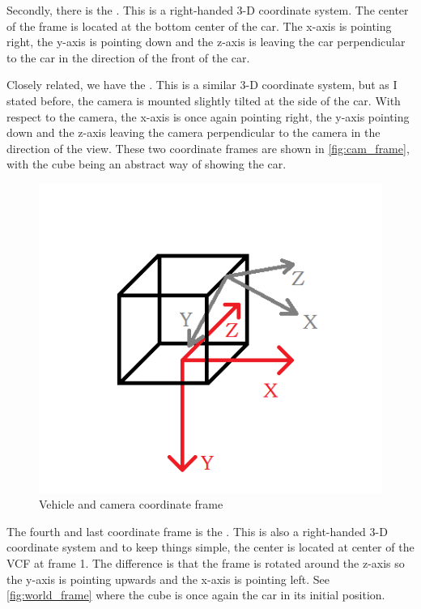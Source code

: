 Secondly, there is the . This is a right-handed 3-D coordinate system. The center of the frame is located at the bottom center of the car. The x-axis is pointing right, the y-axis is pointing down and the z-axis is leaving the car perpendicular to the car in the direction of the front of the car. \bigskip

Closely related, we have the . This is a similar 3-D coordinate system, but as I stated before, the camera is mounted slightly tilted at the side of the car. With respect to the camera, the x-axis is once again pointing right, the y-axis pointing down and the z-axis leaving the camera perpendicular to the camera in the direction of the view. These two coordinate frames are shown in \autoref{fig:cam_frame}, with the cube being an abstract way of showing the car.\bigskip

\begin{figure}
    \centering
    \includegraphics[width=1\textwidth]{figures/camera_frame.png}
    \caption{Vehicle and camera coordinate frame}
    \label{fig:cam_frame}
\end{figure}

The fourth and last coordinate frame is the . This is also a right-handed 3-D coordinate system and to keep things simple, the center is located at center of the VCF at frame 1. The difference is that the frame is rotated around the z-axis so the y-axis is pointing upwards and the x-axis is pointing left. See \autoref{fig:world_frame} where the cube is once again the car in its initial position.\bigskip

